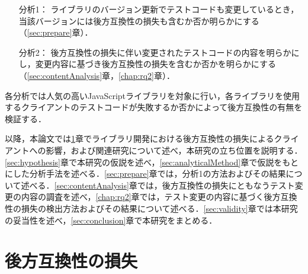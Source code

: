 \documentclass[submit]{ipsj}
\begin{document}
\begin{itemize}
\item[分析1：] ライブラリのバージョン更新でテストコードも変更しているとき，当該バージョンには後方互換性の損失も含むか否か明らかにする（\ref{sec:prepare}章）．
\item[分析2：] 後方互換性の損失に伴い変更されたテストコードの内容を明らかにし，変更内容に基づき後方互換性の損失を含むか否かを明らかにする（\ref{sec:contentAnalysis}章，\ref{chap:rq2}章）．
\end{itemize}

各分析では人気の高いJavaScriptライブラリ\textcolor{red}{}を対象に行い，各ライブラリを使用するクライアントのテストコードが失敗するか否かによって後方互換性の有無を検証する．

\textcolor{red}{\cite{matsuda}}

以降，本論文では\ref{sec:backward-compatibility}章でライブラリ開発における後方互換性の損失によるクライアントへの影響，および関連研究について述べ，本研究の立ち位置を説明する．\ref{sec:hypothesis}章で本研究の仮説を述べ，\ref{sec:analyticalMethod}章で仮説をもとにした分析手法を述べる．\ref{sec:prepare}章では，分析1の方法およびその結果について述べる．\ref{sec:contentAnalysis}章では，後方互換性の損失にともなうテスト変更の内容の調査を述べ，\ref{chap:rq2}章では，テスト変更の内容に基づく後方互換性の損失の検出方法およびその結果について述べる．\ref{sec:validity}章では本研究の妥当性を述べ，\ref{sec:conclusion}章で本研究をまとめる．

\section{後方互換性の損失}\label{sec:backward-compatibility}
\end{document}
